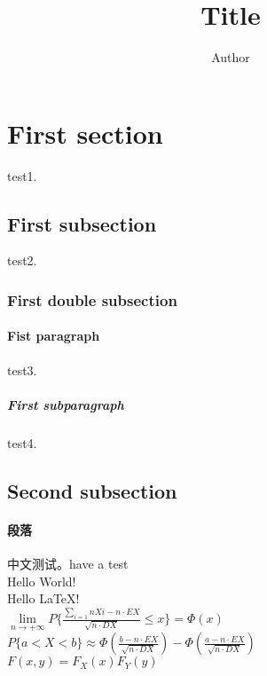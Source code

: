 \documentclass[UTF8]{article}
\author {Author}
\title {Title}
\begin{document}
    \maketitle
    \section{First section} test1.
        \subsection{First subsection} test2.
            \subsubsection{First double subsection}
                \paragraph{Fist paragraph} test3.
                    \subparagraph{First subparagraph} test4.
        \subsection{Second subsection}
            \paragraph{段落} 中文测试。have a test
    \\
    Hello World! \\ %
    Hello \LaTeX ! \\

    $\lim\limits_{n \rightarrow +\infty} P\lbrace\frac{\sum\limits_{i=1}{n}Xi - n\cdot EX}{ \sqrt{n \cdot DX} }  \leqslant x\rbrace = \Phi(x)$ \\

    $P\lbrace a<X<b \rbrace \approx \Phi(\frac{b - n\cdot EX}{\sqrt {n\cdot DX}}) - \Phi(\frac{a - n\cdot EX}{\sqrt{n\cdot DX} })$ \\

    $F(x,y) = F_{X}(x)F_{Y}(y)$
\end{document}

